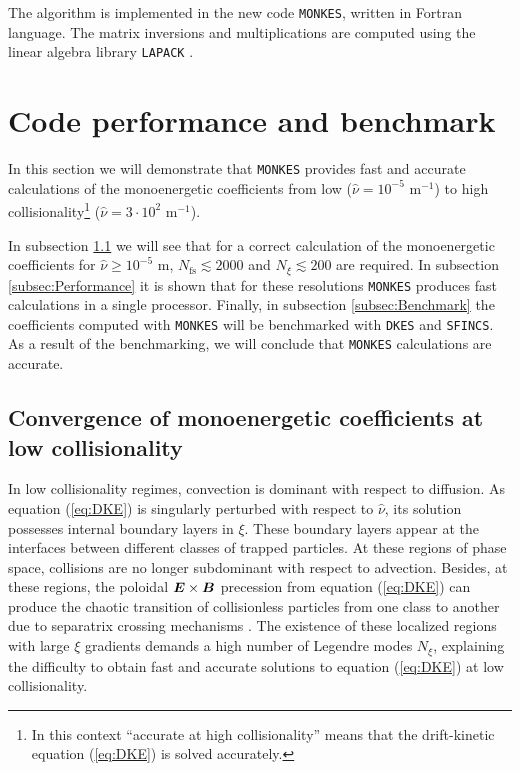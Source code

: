 \documentclass[10pt]{iopart}
\newcommand{\MONKES}{{\texttt{MONKES}}}
\newcommand{\DKES}{{\texttt{DKES}}}
\begin{document}
The algorithm is implemented in the new code {\MONKES}, written in Fortran language. The matrix inversions and multiplications are computed using the linear algebra library \texttt{LAPACK} \cite{lapack99}.
%
\section{Code performance and benchmark}
\label{sec:Results_Benchmark}
In this section we will demonstrate that {\MONKES} provides fast and accurate calculations of the monoenergetic coefficients from low ($\hat{\nu}=10^{-5}$ $\text{m}^{-1}$) to high collisionality\footnote{In this context ``accurate at high collisionality'' means that the drift-kinetic equation (\ref{eq:DKE}) is solved accurately.} ($\hat{\nu}=3\cdot10^{2}$ $\text{m}^{-1}$).

In subsection \ref{subsec:Convergence} we will see that for a correct calculation of the monoenergetic coefficients for $\hat{\nu}\ge 10^{-5}$ m, $N_{\text{fs}} \lesssim  2000$ and $N_\xi \lesssim 200$ are required. In subsection \ref{subsec:Performance} it is shown that for these resolutions {\MONKES} produces fast calculations in a single processor. Finally, in subsection \ref{subsec:Benchmark} the coefficients computed with {\MONKES} will be benchmarked with {\DKES} and {\texttt{SFINCS}}. As a result of the benchmarking, we will conclude that {\MONKES} calculations are accurate.

\subsection{Convergence of monoenergetic coefficients at low collisionality}
\label{subsec:Convergence}
In low collisionality regimes, convection is dominant with respect to diffusion. As equation (\ref{eq:DKE}) is singularly perturbed with respect to $\hat{\nu}$, its solution possesses internal boundary layers in $\xi$. These boundary layers appear at the interfaces between different classes of trapped particles. At these regions of phase space, collisions are no longer subdominant with respect to advection. Besides, at these regions, the poloidal $\vb*{E}\times\vb*{B}$ precession from equation (\ref{eq:DKE}) can produce the chaotic transition of collisionless particles from one class to another due to separatrix crossing mechanisms \cite{Cary_Separatrix_Crossing, dherbemont2022}. The existence of these localized regions with large $\xi$ gradients demands a high number of Legendre modes $N_\xi$, explaining the difficulty to obtain fast and accurate solutions to equation (\ref{eq:DKE}) at low collisionality. 
\end{document}
